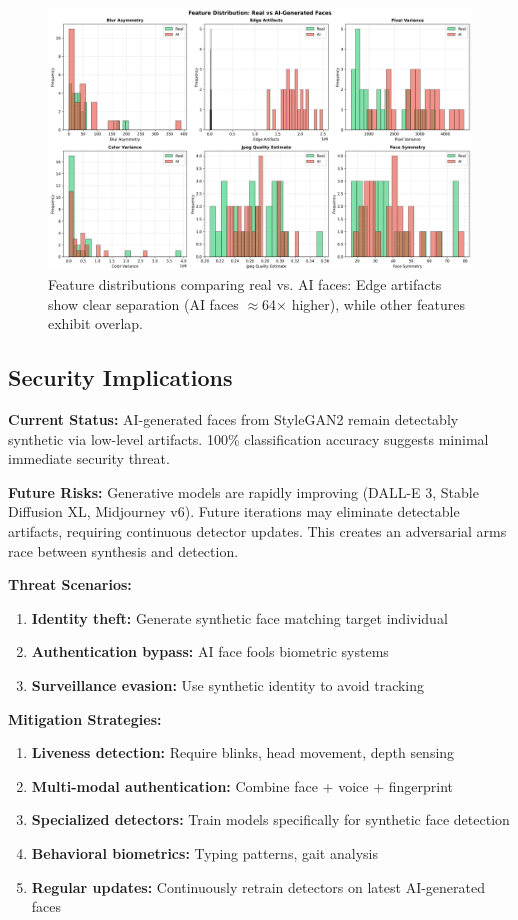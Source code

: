 \documentclass[11pt,a4paper]{article}
\begin{document}
\begin{figure}[H]
    \centering
    \includegraphics[width=\textwidth]{runs/ai_detection_distributions.png}
    \caption{Feature distributions comparing real vs. AI faces: Edge artifacts show clear separation (AI faces $\approx$64× higher), while other features exhibit overlap.}
    \label{fig:ai_distributions}
\end{figure}

\subsection{Security Implications}

\textbf{Current Status:} AI-generated faces from StyleGAN2 remain detectably synthetic via low-level artifacts. 100\% classification accuracy suggests minimal immediate security threat.

\textbf{Future Risks:} Generative models are rapidly improving (DALL-E 3, Stable Diffusion XL, Midjourney v6). Future iterations may eliminate detectable artifacts, requiring continuous detector updates. This creates an adversarial arms race between synthesis and detection.

\textbf{Threat Scenarios:}
\begin{enumerate}
    \item \textbf{Identity theft:} Generate synthetic face matching target individual
    \item \textbf{Authentication bypass:} AI face fools biometric systems
    \item \textbf{Surveillance evasion:} Use synthetic identity to avoid tracking
\end{enumerate}

\textbf{Mitigation Strategies:}
\begin{enumerate}
    \item \textbf{Liveness detection:} Require blinks, head movement, depth sensing
    \item \textbf{Multi-modal authentication:} Combine face + voice + fingerprint
    \item \textbf{Specialized detectors:} Train models specifically for synthetic face detection
    \item \textbf{Behavioral biometrics:} Typing patterns, gait analysis
    \item \textbf{Regular updates:} Continuously retrain detectors on latest AI-generated faces
\end{enumerate}
\end{document}
